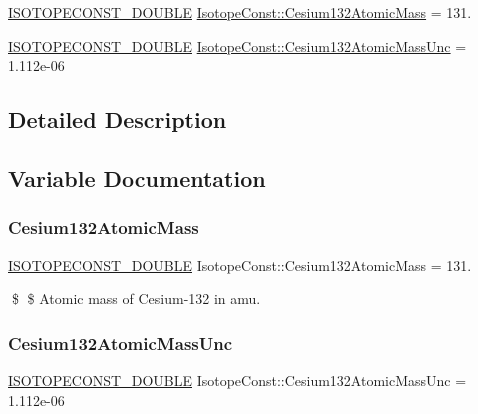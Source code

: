 \begin{DoxyCompactItemize}
\item 
\mbox{\hyperlink{group___isotope_const-_macros_ga8f45a7272ce02c0b4c65c44636ed719a}{I\+S\+O\+T\+O\+P\+E\+C\+O\+N\+S\+T\+\_\+\+D\+O\+U\+B\+LE}} \mbox{\hyperlink{group___isotope_const-_cesium-_cs132_ga3e039e364c7d3a81daab5fe684278ebe}{Isotope\+Const\+::\+Cesium132\+Atomic\+Mass}} = 131.
\item 
\mbox{\hyperlink{group___isotope_const-_macros_ga8f45a7272ce02c0b4c65c44636ed719a}{I\+S\+O\+T\+O\+P\+E\+C\+O\+N\+S\+T\+\_\+\+D\+O\+U\+B\+LE}} \mbox{\hyperlink{group___isotope_const-_cesium-_cs132_gae9d426fc64e10281e54b5159ea80c71f}{Isotope\+Const\+::\+Cesium132\+Atomic\+Mass\+Unc}} = 1.\+112e-\/06
\end{DoxyCompactItemize}


\subsection{Detailed Description}


\subsection{Variable Documentation}
\mbox{\label{group___isotope_const-_cesium-_cs132_ga3e039e364c7d3a81daab5fe684278ebe}} 
\subsubsection{\texorpdfstring{Cesium132\+Atomic\+Mass}{Cesium132AtomicMass}}
{\footnotesize\ttfamily \mbox{\hyperlink{group___isotope_const-_macros_ga8f45a7272ce02c0b4c65c44636ed719a}{I\+S\+O\+T\+O\+P\+E\+C\+O\+N\+S\+T\+\_\+\+D\+O\+U\+B\+LE}} Isotope\+Const\+::\+Cesium132\+Atomic\+Mass = 131.}

\$ \$ Atomic mass of Cesium-\/132 in amu. \mbox{\label{group___isotope_const-_cesium-_cs132_gae9d426fc64e10281e54b5159ea80c71f}} 
\subsubsection{\texorpdfstring{Cesium132\+Atomic\+Mass\+Unc}{Cesium132AtomicMassUnc}}
{\footnotesize\ttfamily \mbox{\hyperlink{group___isotope_const-_macros_ga8f45a7272ce02c0b4c65c44636ed719a}{I\+S\+O\+T\+O\+P\+E\+C\+O\+N\+S\+T\+\_\+\+D\+O\+U\+B\+LE}} Isotope\+Const\+::\+Cesium132\+Atomic\+Mass\+Unc = 1.\+112e-\/06}

